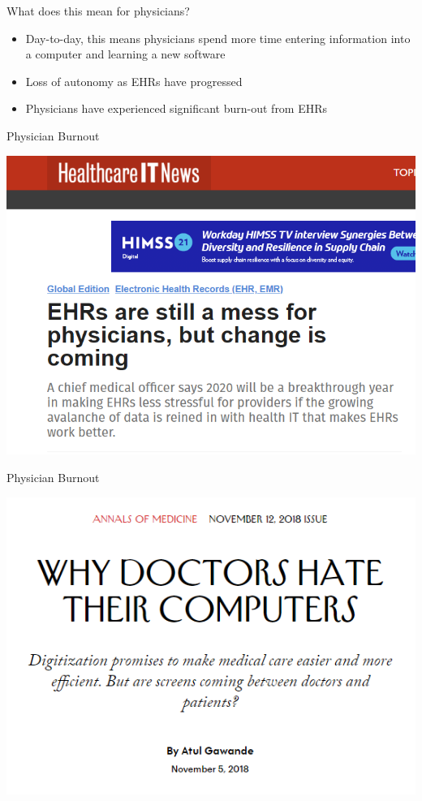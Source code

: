 \documentclass[10pt]{beamer}
\begin{document}
\begin{frame}[fragile]{What does this mean for physicians?}
\begin{itemize}
    \item Day-to-day, this means physicians spend more time entering information into a computer and learning a new software
    \item Loss of autonomy as EHRs have progressed
    \item Physicians have experienced significant burn-out from EHRs
\end{itemize}

\end{frame}

\begin{frame}[noframenumbering]{Physician Burnout}
\begin{center}
    \includegraphics[scale=.4]{graphics/News Clip1.PNG}
\end{center}
\end{frame}

\begin{frame}[noframenumbering]{Physician Burnout}
\begin{center}
    \includegraphics[scale=.5]{graphics/News Clip2.PNG}
\end{center}
\end{frame}
\end{document}

